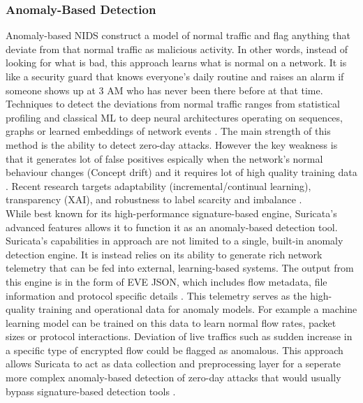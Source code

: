 \subsubsection{Anomaly-Based Detection}
Anomaly-based NIDS construct a model of normal traffic and flag anything that deviate from that normal traffic as malicious activity. In other words, instead of looking for what is bad, this approach learns what is normal on a network. It is like a security guard that knows everyone's daily routine and raises an alarm if someone shows up at 3 AM who has never been there before at that time. Techniques to detect the deviations from normal traffic ranges from statistical profiling and classical ML to deep neural architectures operating on sequences, graphs or learned embeddings of network events \parencite{ACM2024DLIDSReview,Diana2025Overview}. The main strength of this method is the ability to detect zero-day attacks. However the key weakness is that it generates lot of false positives espically when the network's normal behaviour changes (Concept drift) and it requires lot of high quality training data \parencite{KBS2025Datasets,AppliedIntelligence2025Benchmark}. Recent research targets adaptability (incremental/continual learning), transparency (XAI), and robustness to label scarcity and imbalance \parencite{Cerasuolo2025Adaptable,AppliedIntelligence2025Benchmark}.\\

\noindent While best known for its high-performance signature-based engine, Suricata's advanced features allows it to function it as an anomaly-based detection tool. Suricata's capabilities in approach are not limited to a single, built-in anomaly detection engine. It is instead relies on its ability to generate rich network telemetry that can be fed into external, learning-based systems. The output from this engine is in the form of EVE JSON, which includes flow metadata, file information and protocol specific details \parencite{SuricataDocs2025}.
This telemetry serves as the high-quality training and operational data for anomaly models. For example a machine learning model can be trained on this data to learn normal flow rates, packet sizes or protocol interactions. Deviation of live traffics such as sudden increase in a specific type of encrypted flow could be flagged as anomalous. This approach allows Suricata to act as data collection and preprocessing layer for a seperate more complex anomaly-based detection of zero-day attacks that would usually bypass signature-based detection tools \parencite{Han2023HPNIDS}.

